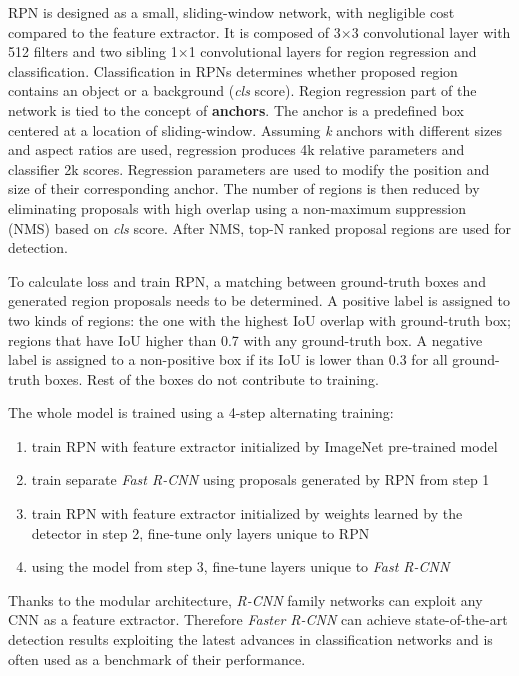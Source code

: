 RPN is designed as a small, sliding-window network, with negligible cost compared to the feature extractor. It is composed of 3$\times$3 convolutional layer with 512 filters and two sibling 1$\times$1 convolutional layers for region regression and classification. Classification in RPNs determines whether proposed region contains an object or a background (\textit{cls} score). Region regression part of the network is tied to the concept of \textbf{anchors}. The anchor is a predefined box centered at a location of sliding-window. Assuming \textit{k} anchors with different sizes and aspect ratios are used, regression produces 4k relative parameters and classifier 2k scores. Regression parameters are used to modify the position and size of their corresponding anchor. The number of regions is then reduced by eliminating proposals with high overlap using a non-maximum suppression (NMS) based on \textit{cls} score. After NMS, top-N ranked proposal regions are used for detection.
 
 To calculate loss and train RPN, a matching between ground-truth boxes and generated region proposals needs to be determined. A positive label is assigned to two kinds of regions: the one with the highest IoU overlap with ground-truth box; regions that have IoU higher than 0.7 with any ground-truth box. A negative label is assigned to a non-positive box if its IoU is lower than 0.3 for all ground-truth boxes. Rest of the boxes do not contribute to training. 
 
 The whole model is trained using a 4-step alternating training:
 
 \begin{enumerate}
     \item train RPN with feature extractor initialized by ImageNet pre-trained model
     \item train separate \textit{Fast R-CNN} using proposals generated by RPN from step 1
     \item train RPN with feature extractor initialized by weights learned by the detector in step 2, fine-tune only layers unique to RPN
     \item using the model from step 3, fine-tune layers unique to \textit{Fast R-CNN}
 \end{enumerate}

Thanks to the modular architecture, \textit{R-CNN} family networks can exploit any CNN as a feature extractor.  Therefore \textit{Faster R-CNN} can achieve state-of-the-art detection results exploiting the latest advances in classification networks and is often used as a benchmark of their performance.
     

